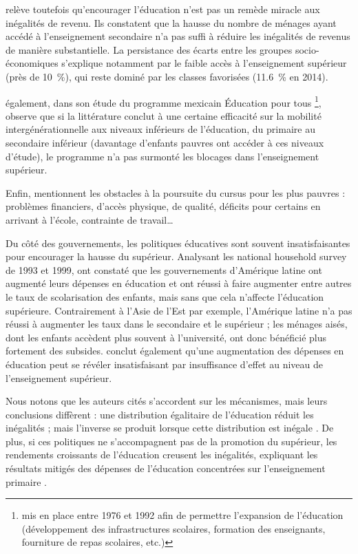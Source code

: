 \documentclass[pagesize, twoside=off, bibliography=totoc, DIV=calc, fontsize=12pt, a4paper, french]{scrartcl}
\begin{document}
 relève toutefois qu’encourager l’éducation n’est pas un remède miracle aux inégalités de revenu. Ils constatent que la hausse du nombre de ménages ayant accédé à l’enseignement secondaire n’a pas suffi à réduire les inégalités de revenus de manière substantielle. La persistance des écarts entre les groupes socio-économiques s’explique notamment par le faible accès à l’enseignement supérieur (près de \SI{10}{\percent}), qui reste dominé par les classes favorisées (\SI{11.6}{\percent} en 2014). 

 également, dans son étude du programme mexicain \og{}Éducation pour tous\fg{} \footnote{\label{ft_mex} mis en place entre 1976 et 1992 afin de permettre \og{}l’expansion de l’éducation\fg{} (développement des infrastructures scolaires, formation des enseignants, fourniture de repas scolaires, etc.)}, observe que si la littérature conclut à une certaine efficacité sur la mobilité intergénérationnelle aux niveaux inférieurs de l’éducation, du primaire au secondaire inférieur (davantage d’enfants pauvres ont accéder à ces niveaux d’étude), le programme n’a pas surmonté les blocages dans l’enseignement supérieur.

Enfin, \citet{birdsall_education_1998} mentionnent les obstacles à la poursuite du cursus pour les plus pauvres : problèmes financiers, d’accès physique, de qualité, déficits pour certains en arrivant à l’école, contrainte de travail…

Du côté des gouvernements, les politiques éducatives sont souvent insatisfaisantes pour encourager la hausse du supérieur. Analysant les \og{}national household survey\fg{} de 1993 et 1999, \citet{birdsall_education_1998} ont constaté que les gouvernements d’Amérique latine ont augmenté leurs dépenses en éducation et ont réussi à faire augmenter entre autres le taux de scolarisation des enfants, mais sans que cela n’affecte l’éducation supérieure. Contrairement à l’Asie de l’Est par exemple, l’Amérique latine n’a pas réussi à augmenter les taux dans le secondaire et le supérieur ; les ménages aisés, dont les enfants accèdent plus souvent à l’université, ont donc bénéficié plus fortement des subsides.  conclut également qu’une augmentation des dépenses en éducation peut se révéler insatisfaisant par insuffisance d’effet au niveau de l'enseignement supérieur.

Nous notons que les auteurs cités s’accordent sur les mécanismes, mais leurs conclusions diffèrent : une distribution égalitaire de l’éducation réduit les inégalités \citep{trejos_inequality_2004} ; mais l’inverse se produit lorsque cette distribution est inégale \citep{birdsall_education_1998}. De plus, si ces politiques ne s’accompagnent pas de la promotion du supérieur, les rendements croissants de l’éducation creusent les inégalités, expliquant les résultats mitigés des dépenses de l'éducation concentrées sur l’enseignement primaire \citep{urbina_intergenerational_2018}.
\end{document}
